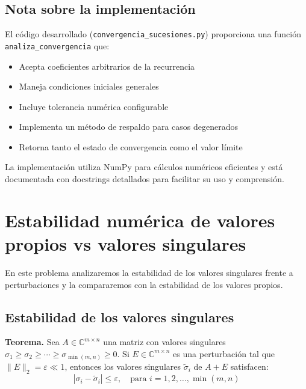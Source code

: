 \documentclass[12pt]{article}
\begin{document}
\subsection{Nota sobre la implementación}

El código desarrollado (\texttt{convergencia\_sucesiones.py}) proporciona una función \texttt{analiza\_convergencia} que:
\begin{itemize}
    \item Acepta coeficientes arbitrarios de la recurrencia
    \item Maneja condiciones iniciales generales
    \item Incluye tolerancia numérica configurable
    \item Implementa un método de respaldo para casos degenerados
    \item Retorna tanto el estado de convergencia como el valor límite
\end{itemize}

La implementación utiliza NumPy para cálculos numéricos eficientes y está documentada con docstrings detallados para facilitar su uso y comprensión.

\vspace{2cm}

\section{Estabilidad numérica de valores propios vs valores singulares}

En este problema analizaremos la estabilidad de los valores singulares frente a perturbaciones y la compararemos con la estabilidad de los valores propios.

\subsection{Estabilidad de los valores singulares}

\textbf{Teorema.} Sea $A \in \mathbb{C}^{m \times n}$ una matriz con valores singulares $\sigma_1 \geq \sigma_2 \geq \cdots \geq \sigma_{\min(m,n)} \geq 0$. Si $E \in \mathbb{C}^{m \times n}$ es una perturbación tal que $\|E\|_2 = \varepsilon \ll 1$, entonces los valores singulares $\tilde{\sigma}_i$ de $A + E$ satisfacen:
\[
|\sigma_i - \tilde{\sigma}_i| \leq \varepsilon, \quad \text{para } i = 1, 2, \ldots, \min(m,n)
\]
\end{document}
